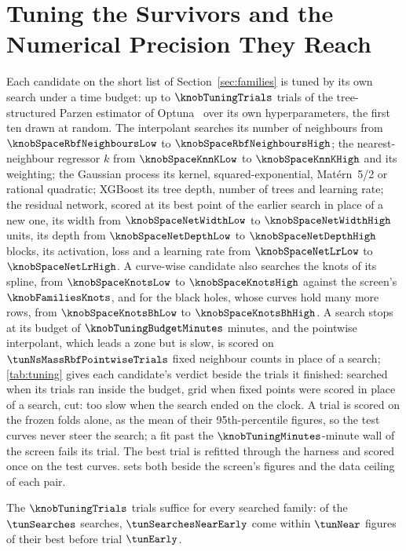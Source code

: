 \section{Tuning the Survivors and the Numerical Precision They Reach}
\label{sec:precision}

Each candidate on the short list of Section~\ref{sec:families} is tuned by its own search under a time budget: up to $\knobTuningTrials$ trials of the tree-structured Parzen estimator of Optuna~\citep{Akiba2019_Optuna} over its own hyperparameters, the first ten drawn at random. The interpolant searches its number of neighbours from $\knobSpaceRbfNeighboursLow$ to $\knobSpaceRbfNeighboursHigh$; the nearest-neighbour regressor $k$ from $\knobSpaceKnnKLow$ to $\knobSpaceKnnKHigh$ and its weighting; the Gaussian process its kernel, squared-exponential, Mat\'ern~5/2 or rational quadratic; XGBoost its tree depth, number of trees and learning rate; the residual network, scored at its best point of the earlier search in place of a new one, its width from $\knobSpaceNetWidthLow$ to $\knobSpaceNetWidthHigh$ units, its depth from $\knobSpaceNetDepthLow$ to $\knobSpaceNetDepthHigh$ blocks, its activation, loss and a learning rate from $\knobSpaceNetLrLow$ to $\knobSpaceNetLrHigh$. A curve-wise candidate also searches the knots of its spline, from $\knobSpaceKnotsLow$ to $\knobSpaceKnotsHigh$ against the screen's $\knobFamiliesKnots$, and for the black holes, whose curves hold many more rows, from $\knobSpaceKnotsBhLow$ to $\knobSpaceKnotsBhHigh$. A search stops at its budget of $\knobTuningBudgetMinutes$ minutes, and the pointwise interpolant, which leads a zone but is slow, is scored on $\tunNsMassRbfPointwiseTrials$ fixed neighbour counts in place of a search; \cref{tab:tuning} gives each candidate's verdict beside the trials it finished: searched when its trials ran inside the budget, grid when fixed points were scored in place of a search, cut: too slow when the search ended on the clock. A trial is scored on the frozen folds alone, as the mean of their 95th-percentile figures, so the test curves never steer the search; a fit past the $\knobTuningMinutes$-minute wall of the screen fails its trial. The best trial is refitted through the harness and scored once on the test curves.  sets both beside the screen's figures and the data ceiling of each pair.


The $\knobTuningTrials$ trials suffice for every searched family: of the $\tunSearches$ searches, $\tunSearchesNearEarly$ come within $\tunNear$ figures of their best before trial $\tunEarly$.

